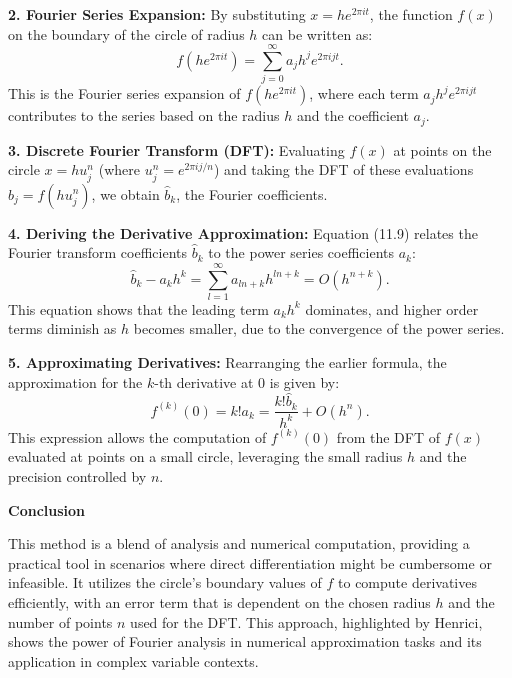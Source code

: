 \documentclass[8pt]{article}
\begin{document}
\textbf{2. Fourier Series Expansion:}
   By substituting \( x = he^{2\pi it} \), the function \( f(x) \) on the boundary of the circle of radius \( h \) can be written as:
   \[
   f(he^{2\pi it}) = \sum_{j=0}^{\infty} a_j h^j e^{2\pi i jt}.
   \]
   This is the Fourier series expansion of \( f(he^{2\pi it}) \), where each term \( a_j h^j e^{2\pi i jt} \) contributes to the series based on the radius \( h \) and the coefficient \( a_j \).

\textbf{3. Discrete Fourier Transform (DFT):}
   Evaluating \( f(x) \) at points on the circle \( x = hu_j^n \) (where \( u_j^n = e^{2\pi i j/n} \)) and taking the DFT of these evaluations \( b_j = f(hu_j^n) \), we obtain \( \hat{b}_k \), the Fourier coefficients.

\textbf{4. Deriving the Derivative Approximation:}
   Equation (11.9) relates the Fourier transform coefficients \( \hat{b}_k \) to the power series coefficients \( a_k \):
   \[
   \hat{b}_k - a_k h^k = \sum_{l=1}^{\infty} a_{ln+k} h^{ln+k} = O(h^{n+k}).
   \]
   This equation shows that the leading term \( a_k h^k \) dominates, and higher order terms diminish as \( h \) becomes smaller, due to the convergence of the power series.

\textbf{5. Approximating Derivatives:}
   Rearranging the earlier formula, the approximation for the \( k \)-th derivative at 0 is given by:
   \[
   f^{(k)}(0) = k! a_k = \frac{k! \hat{b}_k}{h^k} + O(h^n).
   \]
   This expression allows the computation of \( f^{(k)}(0) \) from the DFT of \( f(x) \) evaluated at points on a small circle, leveraging the small radius \( h \) and the precision controlled by \( n \).

\textbf{Conclusion}

This method is a blend of analysis and numerical computation, providing a practical tool in scenarios where direct differentiation might be cumbersome or infeasible. It utilizes the circle's boundary values of \( f \) to compute derivatives efficiently, with an error term that is dependent on the chosen radius \( h \) and the number of points \( n \) used for the DFT. This approach, highlighted by Henrici, shows the power of Fourier analysis in numerical approximation tasks and its application in complex variable contexts.
\end{document}
